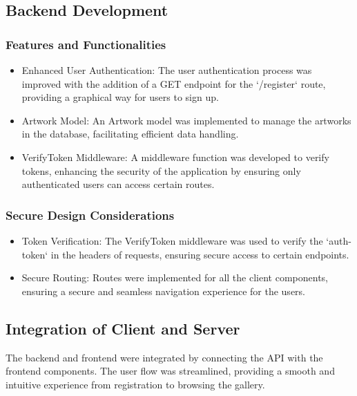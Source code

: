 \documentclass[11pt]{article}
\begin{document}
\subsection{Backend Development}
\label{sec:org3306480}

\subsubsection{Features and Functionalities}
\label{sec:org9366fd4}
\begin{itemize}
\item Enhanced User Authentication: The user authentication process was improved
with the addition of a GET endpoint for the `/register` route, providing a
graphical way for users to sign up.
\item Artwork Model: An Artwork model was implemented to manage the artworks in
the database, facilitating efficient data handling.
\item VerifyToken Middleware: A middleware function was developed to verify
tokens, enhancing the security of the application by ensuring only
authenticated users can access certain routes.
\end{itemize}

\subsubsection{Secure Design Considerations}
\label{sec:org02518a0}
\begin{itemize}
\item Token Verification: The VerifyToken middleware was used to verify the
`auth-token` in the headers of requests, ensuring secure access to certain
endpoints.
\item Secure Routing: Routes were implemented for all the client components,
ensuring a secure and seamless navigation experience for the users.
\end{itemize}

\subsection{Integration of Client and Server}
\label{sec:org3b40aac}
The backend and frontend were integrated by connecting the API with the frontend
components. The user flow was streamlined, providing a smooth and intuitive
experience from registration to browsing the gallery. 
\end{document}
